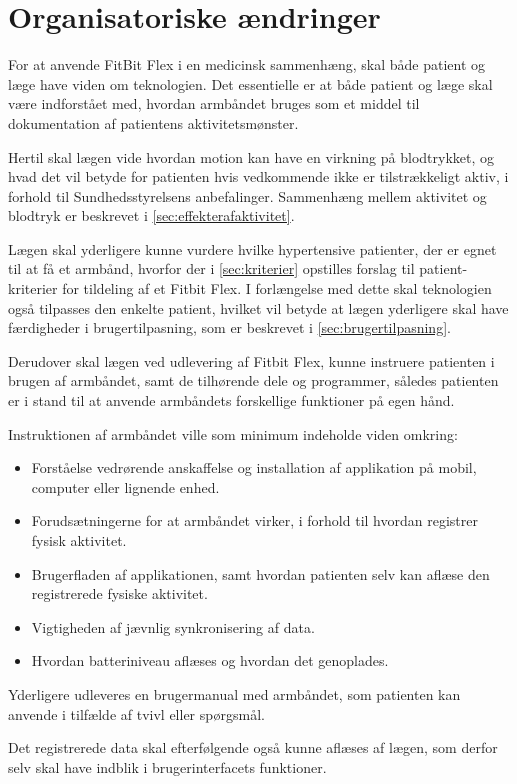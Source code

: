 \section{Organisatoriske ændringer}\label{sec:org_aendringer}

For at anvende FitBit Flex i en medicinsk sammenhæng, skal både patient og læge have viden om teknologien. Det essentielle er at både patient og læge skal være indforstået med, hvordan armbåndet bruges som et middel til dokumentation af patientens aktivitetsmønster.

Hertil skal lægen vide hvordan motion kan have en virkning på blodtrykket, og hvad det vil betyde for patienten hvis vedkommende ikke er tilstrækkeligt aktiv, i forhold til Sundhedsstyrelsens anbefalinger. Sammenhæng mellem aktivitet og blodtryk er beskrevet i \autoref{sec:effekterafaktivitet}.

Lægen skal yderligere kunne vurdere hvilke hypertensive patienter, der er egnet til at få et armbånd, hvorfor der i \autoref{sec:kriterier} opstilles forslag til patient-kriterier for tildeling af et Fitbit Flex. I forlængelse med dette skal teknologien også tilpasses den enkelte patient, hvilket vil betyde at lægen yderligere skal have færdigheder i brugertilpasning, som er beskrevet i \autoref{sec:brugertilpasning}. 

Derudover skal lægen ved udlevering af Fitbit Flex, kunne instruere patienten i brugen af armbåndet, samt de tilhørende dele og programmer, således patienten er i stand til at anvende armbåndets forskellige funktioner på egen hånd. 

Instruktionen af armbåndet ville som minimum indeholde viden omkring: 
\begin{itemize}
\item Forståelse vedrørende anskaffelse og installation af applikation på mobil, computer eller lignende enhed. 
\item Forudsætningerne for at armbåndet virker, i forhold til hvordan registrer fysisk aktivitet. 
\item Brugerfladen af applikationen, samt hvordan patienten selv kan aflæse den registrerede fysiske aktivitet.  
\item Vigtigheden af jævnlig synkronisering af data. 
\item Hvordan batteriniveau aflæses og hvordan det genoplades. 
\end{itemize} 

Yderligere udleveres en brugermanual med armbåndet, som patienten kan anvende i tilfælde af tvivl eller spørgsmål.   

Det registrerede data skal efterfølgende også kunne aflæses af lægen, som derfor selv skal have indblik i brugerinterfacets funktioner.

